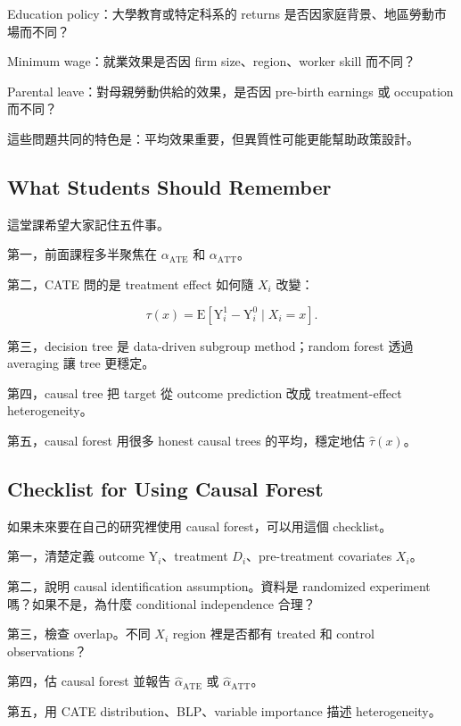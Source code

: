 \documentclass[
  chinese,
  11pt,
]{article}
\begin{document}
Education policy：大學教育或特定科系的 returns
是否因家庭背景、地區勞動市場而不同？

Minimum wage：就業效果是否因 firm size、region、worker skill 而不同？

Parental leave：對母親勞動供給的效果，是否因 pre-birth earnings 或
occupation 而不同？

這些問題共同的特色是：平均效果重要，但異質性可能更能幫助政策設計。

\subsection{What Students Should
Remember}\label{what-students-should-remember}

這堂課希望大家記住五件事。

第一，前面課程多半聚焦在 \(\alpha_{\text{ATE}}\) 和
\(\alpha_{\text{ATT}}\)。

第二，CATE 問的是 treatment effect 如何隨 \(X_i\) 改變：

\[
\tau(x)=
\mathrm{E}\left[\mathrm{Y}^{1}_{i}-\mathrm{Y}^{0}_{i}\mid X_i=x\right].
\]

第三，decision tree 是 data-driven subgroup method；random forest 透過
averaging 讓 tree 更穩定。

第四，causal tree 把 target 從 outcome prediction 改成 treatment-effect
heterogeneity。

第五，causal forest 用很多 honest causal trees 的平均，穩定地估
\(\hat{\tau}(x)\)。

\subsection{Checklist for Using Causal
Forest}\label{checklist-for-using-causal-forest}

如果未來要在自己的研究裡使用 causal forest，可以用這個 checklist。

第一，清楚定義 outcome \(\mathrm{Y}_i\)、treatment
\(D_i\)、pre-treatment covariates \(X_i\)。

第二，說明 causal identification assumption。資料是 randomized
experiment 嗎？如果不是，為什麼 conditional independence 合理？

第三，檢查 overlap。不同 \(X_i\) region 裡是否都有 treated 和 control
observations？

第四，估 causal forest 並報告 \(\hat{\alpha}_{\text{ATE}}\) 或
\(\hat{\alpha}_{\text{ATT}}\)。

第五，用 CATE distribution、BLP、variable importance 描述
heterogeneity。
\end{document}
